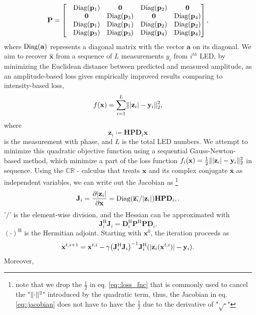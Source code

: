 \documentclass{article}
\DeclarePairedDelimiter\abs{\lvert}{\rvert}%
\DeclarePairedDelimiter\norm{\lVert}{\rVert}%
\providecommand{\vx}{\mathbf{x}}
\providecommand{\vy}{\mathbf{y}}
\providecommand{\vzz}{\mathbf{z}}
\providecommand{\vq}{\mathbf{q}}
\providecommand{\vp}{\mathbf{p}}
\providecommand{\vq}{\mathbf{q}}
\providecommand{\mJ}{\mathbf{J}}
\providecommand{\mD}{\mathbf{D}}
\providecommand{\mJ}{\mathbf{J}}
\providecommand{\mP}{\mathbf{P}}
\providecommand{\mH}{\mathbf{H}}
\providecommand{\R}{\ensuremath{\mathbb{R}}}
\providecommand{\C}{\ensuremath{\mathbb{C}}}
\begin{document}
\begin{equation}
    \mP=\PPmatrix,
\end{equation}
where $\text{Diag}(\mathbf{a})$ represents a diagonal matrix with the vector $\mathbf{a}$ on its diagonal. We aim to recover $\hat{\vx}$ from a sequence of $L$ measurements $y_i$ from $i^{th}$ LED, by minimizing the Euclidean distance between predicted and measured amplitude, as an amplitude-based loss gives empirically improved results comparing to intensity-based loss\cite{yeh2015experimental}, 
\begin{equation}
    f(\vx) = \sum_{i=1}^{L}\norm{\abs{\vzz_i}-\vy_i}_2^2,
    \label{eq::loss_fnc}
\end{equation}
where 
\begin{equation}
    \vzz_i\coloneqq\mH\mP\mD_i\vx
\end{equation}
is the measurement with phase, and $L$ is the total LED numbers. We attempt to minimize this quadratic objective function using a sequential Gauss-Newton-based method, which minimize a part of the loss function $f_i(\vx) = \frac{1}{2}\norm{\abs{\vzz_i}-\vy_i}_2^2$ in sequence. Using the $\C\R$ - calculus\cite{kreutz2009complex} that treats $\vx$ and its complex conjugate $\bar{\vx}$ as independent variables, we can write out the Jacobian as \footnote{note that we drop the $\frac{1}{2}$ in eq. \ref{eq::loss_fnc} that is commonly used to cancel the "$\norm{\cdot}^2$" introduced by the quadratic term, thus, the Jacobian in eq.\ref{eq::jacobian} does not have to have the $\frac{1}{2}$ due to the derivative of "$\sqrt{\cdot}$"}
\begin{equation}
    \mJ_i=\frac{\partial \abs{\vzz_i}}{\partial \vx}
    = \diag(\overline{\vzz_i}/\abs{\vzz_i})\mH\mP\mD_i,.
    \label{eq::jacobian}
\end{equation}
'$/$' is the element-wise division, and the Hessian can be approximated with
\begin{equation}
    \mJ_i^\text{H}\mJ_i=\mD_i^{\text{H}}\mP^{\text{H}}\mP\mD_i.
\end{equation}
$(\cdot)^\text{H}$ is the Hermitian adjoint. Starting with $\vx^0$, the iteration proceeds as 
\begin{equation}
    \vx^{t,i+1} = \vx^{t,i} - \gamma\big(\mJ_i^\text{H}\mJ_i\big)^{-1}\mJ_i^\text{H}(\abs{\vzz_i(\vx^{t,i})}-\vy_i).
    \label{eq::gn_update}
\end{equation}
Moreover,
\newcommand{\PmatrixAdj}{
  \begin{bmatrix}
   &\diag(\vp_4/\vq) &\diag(\vp_2/\vq) &\mathbf{0} &\diag(\vp_2/\vq) \\
   &\diag(-\vp_4/\vq) &\diag(\vp_3/\vq) &\diag(\vp_4/\vq) &\mathbf{0} \\
   &\diag(\vp_1/\vq) &\diag(\vp_1/\vq) &\diag(\vp_2/\vq) &\diag(\vp_2/\vq) \\
   &\diag(\vp_3/\vq) &\diag(\vp_3/\vq) &\diag(\vp_4/\vq) &\diag(\vp_4/\vq) 
   \end{bmatrix}}
   
\end{document}
